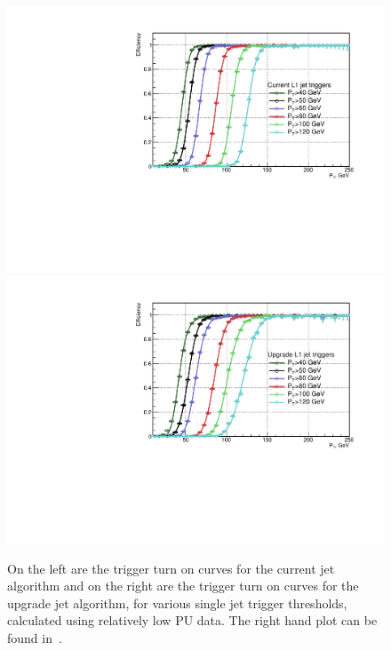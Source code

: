 \begin{figure}[t!]
\begin{center}
  \includegraphics[scale=0.37]{Figures/l1jets//CurrentL1JetTriggers.pdf}
    \includegraphics[scale=0.37]{Figures/l1jets//UpgradeL1JetTriggers.pdf}
\caption{On the left are the trigger turn on curves for the current jet algorithm and on the right are the trigger turn on curves for the upgrade jet algorithm, for various single jet trigger thresholds, calculated using relatively low \ac{PU} data. The right hand plot can be found in~\cite{Tapper:1556311}.}
\label{JetTO_lowPU}
\end{center}
\end{figure}

